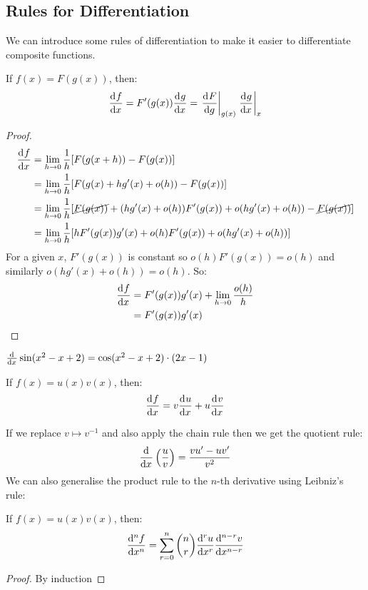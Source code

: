 \documentclass[../main.tex]{subfiles}
\begin{document}
\subsection{Rules for Differentiation}
We can introduce some rules of differentiation to make it easier to differentiate composite functions.
\begin{theorem}
 If $f(x) = F(g(x))$, then:
 \[
   \deriv{f}{x} = F'(g(x))\deriv{g}{x} = \at{\deriv{F}{g}}{g(x)} \at{\deriv{g}{x}}{x}
 \]
\end{theorem}
\begin{proof}
  \begin{align*}
    \deriv{f}{x} &= \lim_{h \to 0} \frac{1}{h} [F(g(x + h)) - F(g(x))] \\
                 &= \lim_{h \to 0} \frac{1}{h} [F(g(x) + hg'(x) + o(h)) - F(g(x))] \\
                 &= \lim_{h \to 0} \frac{1}{h} [\cancel{F(g(x))} + (hg'(x) + o(h))F'(g(x)) + o(hg'(x) + o(h)) - \cancel{F(g(x))}] \\
                 &= \lim_{h \to 0} \frac{1}{h} [hF'(g(x))g'(x) + o(h)F'(g(x)) + o(hg'(x) + o(h))]
  \end{align*}
  For a given $x$, $F'(g(x))$ is constant so $o(h)F'(g(x)) = o(h)$ and similarly $o(hg'(x) + o(h)) = o(h)$. So:
  \begin{align*}
    \deriv{f}{x} &= F'(g(x))g'(x) + \lim_{h \to 0} \frac{o(h)}{h} \\
                 &= F'(g(x))g'(x)
  \end{align*}
\end{proof}
\begin{example}
  $\deriv{}{x} \sin(x^2 - x + 2) = \cos(x^2 - x + 2) \cdot (2x - 1)$
\end{example}
\begin{theorem}
  If $f(x) = u(x)v(x)$, then:
  \[
    \deriv{f}{x} = v \deriv{u}{x} + u \deriv{v}{x}
\]
\end{theorem}
If we replace $v \mapsto v^{-1}$ and also apply the chain rule then we get the quotient rule:
\[
  \deriv{}{x}\left(\frac{u}{v}\right) = \frac{vu' - uv'}{v^2}
\]
We can also generalise the product rule to the $n$-th derivative using Leibniz's rule:
\begin{theorem}
  If $f(x) = u(x)v(x)$, then:
  \[
    \deriv[n]{f}{x} = \sum_{r=0}^{n} \binom{n}{r}\deriv[r]{u}{x}\deriv[n-r]{v}{x}
  \]
\end{theorem}
\begin{proof}
  By induction
\end{proof}
\end{document}

